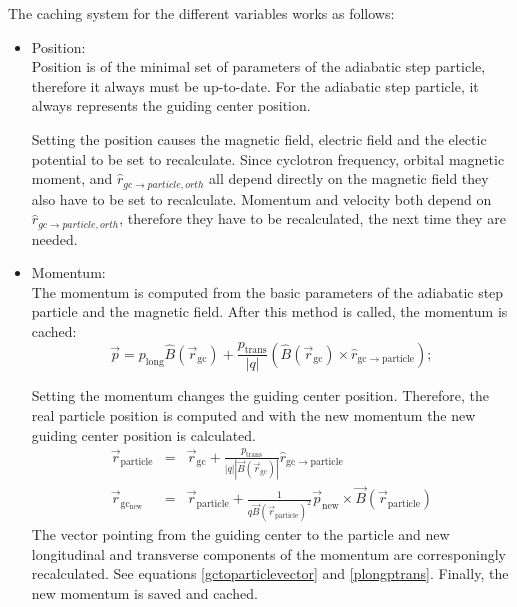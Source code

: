        
	The caching system for the different variables works as follows:
	\begin{itemize}

		\item Position:\\
		Position is of the minimal set of parameters of the adiabatic step particle, therefore it always must be up-to-date. For the adiabatic step particle, it always represents the guiding center position. 
		
		Setting the position causes the magnetic field, electric field and the electic potential to be set to recalculate. Since cyclotron frequency, orbital magnetic moment, and $\hat{r}_{gc \rightarrow particle, orth}$ all depend directly on the magnetic field they also have to be set to recalculate. Momentum and velocity both depend on $\hat{r}_{gc \rightarrow particle, orth}$, therefore they have to be recalculated, the next time they are needed.

		\item Momentum:\\
		The momentum is computed from the basic parameters of the adiabatic step particle and the magnetic field. After this method is called, the momentum is cached:
			\begin{equation}
				\vec{p} = p_{\mathrm{long}} \hat{B}(\vec{r}_{\mathrm{gc}}) + \frac{p_{\mathrm{trans}}}{ |q|} \left( \hat{B}(\vec{r}_{\mathrm{gc}}) \times \hat{r}_{\mathrm{gc \rightarrow particle}} \right);
			\end{equation}

		Setting the momentum changes the guiding center position. Therefore, the real particle position is computed and with the new momentum the new guiding center position is calculated.
			\begin{eqnarray}
				\vec{r}_{\mathrm{particle}} &=& \vec{r}_{\mathrm{gc}} +  \frac{p_{\mathrm{trans}}}{|q| |\vec{B}(\vec{r}_{\mathrm{gc}})|} \hat{r}_{\mathrm{gc \rightarrow particle}} \\
				\vec{r}_{\mathrm{gc_{new}}} &=& \vec{r}_{\mathrm{particle}} + \frac{1}{q \vec{B}(\vec{r}_{\mathrm{particle}})^{2}} \vec{p}_{\mathrm{new}}\times \vec{B}(\vec{r}_{\mathrm{particle}})
			\end{eqnarray}
		The vector pointing from the guiding center to the particle and new longitudinal and transverse components of the momentum are corresponingly recalculated. See equations \ref{gctoparticlevector} and \ref{plongptrans}. Finally, the new momentum is saved and cached.


\end{itemize}

